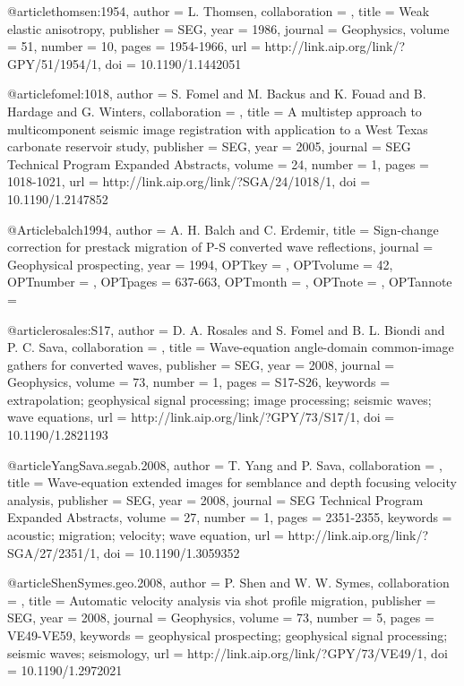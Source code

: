{@article{thomsen:1954,
author = {L. Thomsen},
collaboration = {},
title = {Weak elastic anisotropy},
publisher = {SEG},
year = {1986},
journal = {Geophysics},
volume = {51},
number = {10},
pages = {1954-1966},
url = {http://link.aip.org/link/?GPY/51/1954/1},
doi = {10.1190/1.1442051}
}


@article{fomel:1018,
author = {S. Fomel and M. Backus and K. Fouad and B. Hardage and G. Winters},
collaboration = {},
title = {A multistep approach to multicomponent seismic image
                  registration with application to a {W}est {T}exas
                  carbonate reservoir study},
publisher = {SEG},
year = {2005},
journal = {SEG Technical Program Expanded Abstracts},
volume = {24},
number = {1},
pages = {1018-1021},
url = {http://link.aip.org/link/?SGA/24/1018/1},
doi = {10.1190/1.2147852}
}




@Article{balch1994,
  author = 	 {A. H. Balch and C. Erdemir},
  title = 	 {Sign-change correction for prestack migration of P-S
                  converted wave reflections},
  journal = 	 {Geophysical prospecting},
  year = 	 {1994},
  OPTkey = 	 {},
  OPTvolume = 	 {42},
  OPTnumber = 	 {},
  OPTpages = 	 {637-663},
  OPTmonth = 	 {},
  OPTnote = 	 {},
  OPTannote = 	 {}
}


@article{rosales:S17,
author = {D. A. Rosales and S. Fomel and B. L. Biondi and P. C. Sava},
collaboration = {},
title = {Wave-equation angle-domain common-image gathers for converted waves},
publisher = {SEG},
year = {2008},
journal = {Geophysics},
volume = {73},
number = {1},
pages = {S17-S26},
keywords = {extrapolation; geophysical signal processing; image processing; seismic waves; wave equations},
url = {http://link.aip.org/link/?GPY/73/S17/1},
doi = {10.1190/1.2821193}
}




@article{YangSava.segab.2008,
author = {T. Yang and P. Sava},
collaboration = {},
title = {Wave-equation extended images for semblance and depth focusing velocity analysis},
publisher = {SEG},
year = {2008},
journal = {SEG Technical Program Expanded Abstracts},
volume = {27},
number = {1},
pages = {2351-2355},
keywords = {acoustic; migration; velocity; wave equation},
url = {http://link.aip.org/link/?SGA/27/2351/1},
doi = {10.1190/1.3059352}
}



@article{ShenSymes.geo.2008,
author = {P. Shen and W. W. Symes},
collaboration = {},
title = {Automatic velocity analysis via shot profile migration},
publisher = {SEG},
year = {2008},
journal = {Geophysics},
volume = {73},
number = {5},
pages = {VE49-VE59},
keywords = {geophysical prospecting; geophysical signal processing; seismic waves; seismology},
url = {http://link.aip.org/link/?GPY/73/VE49/1},
doi = {10.1190/1.2972021}
}






}
